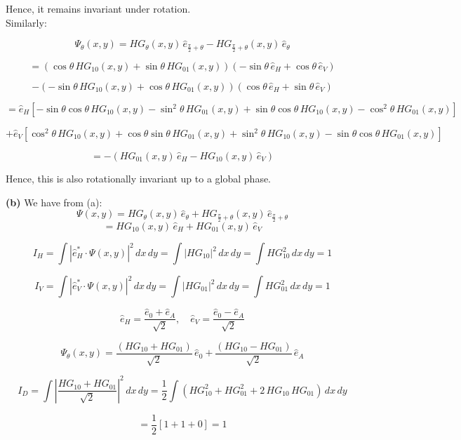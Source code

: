 \documentclass{article}
\begin{document}
Hence, it remains invariant under rotation.\\

Similarly:

\[
\Psi_{\theta}(x, y) = HG_{\theta}(x, y) \, \hat{e}_{\frac{\pi}{2}+\theta} - HG_{\frac{\pi}{2}+\theta}(x, y) \, \hat{e}_{\theta}
\]

\[
= \left( \cos \theta \, HG_{10}(x,y) + \sin \theta \, HG_{01}(x,y) \right) \left( -\sin \theta \, \hat{e}_H + \cos \theta \, \hat{e}_V \right)
\]

\[
- \left( -\sin \theta \, HG_{10}(x,y) + \cos \theta \, HG_{01}(x,y) \right) \left( \cos \theta \, \hat{e}_H + \sin \theta \, \hat{e}_V \right)
\]

\[
= \hat{e}_H \left[ -\sin \theta \cos \theta \, HG_{10}(x,y) - \sin^2 \theta \, HG_{01}(x,y) 
+ \sin \theta \cos \theta \, HG_{10}(x,y) - \cos^2 \theta \, HG_{01}(x,y) \right]
\]

\[
+ \hat{e}_V \left[ \cos^2 \theta \, HG_{10}(x,y) + \cos \theta \sin \theta \, HG_{01}(x,y) 
+ \sin^2 \theta \, HG_{10}(x,y) - \sin \theta \cos \theta \, HG_{01}(x,y) \right]
\]

\[
= -\left( HG_{01}(x,y) \, \hat{e}_H - HG_{10}(x,y) \, \hat{e}_V \right)
\]

Hence, this is also rotationally invariant up to a global phase.

\textbf{(b)} We have from (a):
\[
\Psi(x, y) = HG_{\theta}(x,y) \, \hat{e}_{\theta} + HG_{\frac{\pi}{2}+\theta}(x,y) \, \hat{e}_{\frac{\pi}{2}+\theta}
\]
\[
= HG_{10}(x,y) \, \hat{e}_H + HG_{01}(x,y) \, \hat{e}_V
\]

\[
I_H = \int \left| \hat{e}_H^* \cdot \Psi(x, y) \right|^2 \, dx \, dy 
= \int \left| HG_{10} \right|^2 \, dx \, dy = \int HG_{10}^2 \, dx \, dy = 1
\]

\[
I_V = \int \left| \hat{e}_V^* \cdot \Psi(x, y) \right|^2 \, dx \, dy 
= \int \left| HG_{01} \right|^2 \, dx \, dy = \int HG_{01}^2 \, dx \, dy = 1
\]

\[
\hat{e}_H = \frac{\hat{e}_0 + \hat{e}_A}{\sqrt{2}}, \quad 
\hat{e}_V = \frac{\hat{e}_0 - \hat{e}_A}{\sqrt{2}}
\]

\[
\Psi_{\theta}(x, y) = \frac{(HG_{10} + HG_{01})}{\sqrt{2}} \, \hat{e}_0 
+ \frac{(HG_{10} - HG_{01})}{\sqrt{2}} \, \hat{e}_A
\]

\[
I_D = \int \left| \frac{HG_{10} + HG_{01}}{\sqrt{2}} \right|^2 \, dx \, dy 
= \frac{1}{2} \int \left( HG_{10}^2 + HG_{01}^2 + 2 \, HG_{10} \, HG_{01} \right) \, dx \, dy
\]

\[
= \frac{1}{2} \left[ 1 + 1 + 0 \right] = 1
\]
\end{document}
